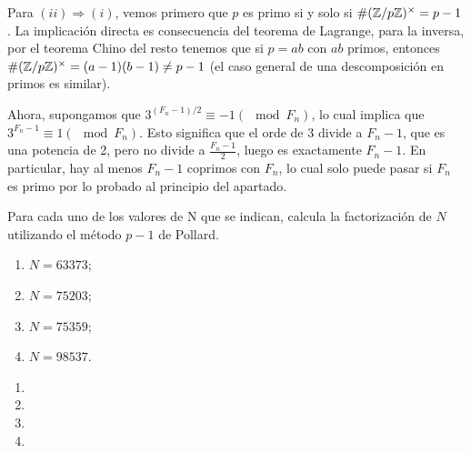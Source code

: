 \documentclass[twoside]{article}
\begin{document}
\begin{solucion}
\begin{enumerate}
Para $(ii)\Rightarrow (i)$, vemos primero que $p$ es primo si y solo si $\#(\mathbb{Z}/p\mathbb{Z})^\times=p-1$. La implicación directa es consecuencia del teorema de Lagrange, para la inversa, por el teorema Chino del resto tenemos que si $p=ab$ con $ab$ primos, entonces $\#(\mathbb{Z}/p\mathbb{Z})^\times=(a-1)(b-1)\neq p-1$ (el caso general de una descomposición en primos es similar). 

Ahora, supongamos que $3^{(F_n−1)/2} ≡ −1 (\mod F_n)$, lo cual implica que $3^{F_n−1} ≡ 1 (\mod F_n)$. Esto significa que el orde de 3 divide a $F_n-1$, que es una potencia de 2, pero no divide a $\frac{F_n-1}{2}$, luego es exactamente $F_n-1$. En particular, hay al menos $F_n-1$ coprimos con $F_n$, lo cual solo puede pasar si $F_n$ es primo por lo probado al principio del apartado. 




 
\end{enumerate}
\end{solucion}

\newpage

\begin{ejercicio}{2}
Para cada uno de los valores de N que se indican, calcula la factorización de $N$
utilizando el método $p − 1$ de Pollard. 
\begin{enumerate}[1)]
\item $N = 63373$;
\item $N = 75203$;
\item $N = 75359$;
\item $N = 98537$.
\end{enumerate}
\end{ejercicio}
\begin{solucion}
\begin{enumerate}
\item
\item
\item
\item
\end{enumerate}
\end{solucion}

\newpage
\end{document}

